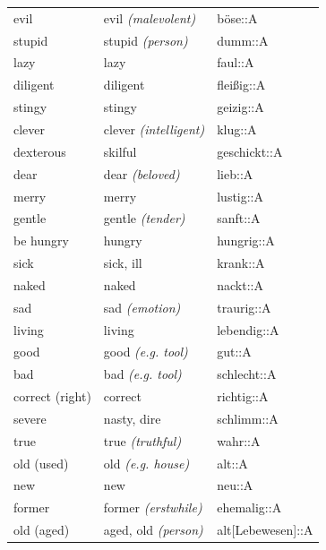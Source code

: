\begin{center}
\begin{longtable}{lll}
{\sc \lowercase{	EVIL	}}	&	evil	\textit{\footnotesize (malevolent)}	&	böse::A	\\
{\sc \lowercase{	STUPID	}}	&	stupid	\textit{\footnotesize (person)}	&	dumm::A	\\
{\sc \lowercase{	LAZY	}}	&	lazy		&	faul::A	\\
{\sc \lowercase{	DILIGENT	}}	&	diligent		&	fleißig::A	\\
{\sc \lowercase{	STINGY	}}	&	stingy		&	geizig::A	\\
{\sc \lowercase{	CLEVER	}}	&	clever	\textit{\footnotesize (intelligent)}	&	klug::A	\\
{\sc \lowercase{	DEXTEROUS	}}	&	skilful		&	geschickt::A	\\
{\sc \lowercase{	DEAR	}}	&	dear	\textit{\footnotesize (beloved)}	&	lieb::A	\\
{\sc \lowercase{	MERRY	}}	&	merry		&	lustig::A	\\
{\sc \lowercase{	GENTLE	}}	&	gentle	\textit{\footnotesize (tender)}	&	sanft::A	\\
{\sc \lowercase{	BE HUNGRY	}}	&	hungry		&	hungrig::A	\\
{\sc \lowercase{	SICK	}}	&	sick, ill		&	krank::A	\\
{\sc \lowercase{	NAKED	}}	&	naked		&	nackt::A	\\
{\sc \lowercase{	SAD	}}	&	sad	\textit{\footnotesize (emotion)}	&	traurig::A	\\
{\sc \lowercase{	LIVING	}}	&	living		&	lebendig::A	\\
{\sc \lowercase{	GOOD	}}	&	good	\textit{\footnotesize (e.g. tool)}	&	gut::A	\\
{\sc \lowercase{	BAD	}}	&	bad	\textit{\footnotesize (e.g. tool)}	&	schlecht::A	\\
{\sc \lowercase{	CORRECT \footnotesize (RIGHT)	}}	&	correct		&	richtig::A	\\
{\sc \lowercase{	SEVERE	}}	&	nasty, dire		&	schlimm::A	\\
{\sc \lowercase{	TRUE	}}	&	true	\textit{\footnotesize (truthful)}	&	wahr::A	\\
{\sc \lowercase{	OLD \footnotesize (USED)	}}	&	old	\textit{\footnotesize (e.g. house)}	&	alt::A	\\
{\sc \lowercase{	NEW	}}	&	new		&	neu::A	\\
{\sc \lowercase{	FORMER	}}	&	former	\textit{\footnotesize (erstwhile)}	&	ehemalig::A	\\
{\sc \lowercase{	OLD \footnotesize (AGED)	}}	&	aged, old	\textit{\footnotesize (person)}	&	alt[Lebewesen]::A	\\

\end{longtable}
\end{center}
